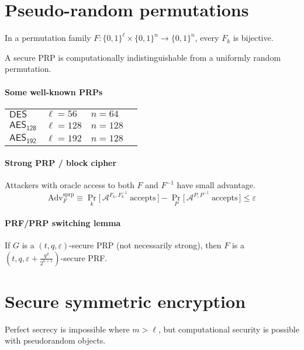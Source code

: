 \documentclass[11pt]{article}
\newcommand{\eqdef}{\ensuremath{\equiv}}
\newcommand{\eps}{\ensuremath{\varepsilon}}
\theoremstyle{remark}
\begin{document}
\section{Pseudo-random permutations}

In a permutation family
$F : \{0,1\}^\ell \times \{0,1\}^n \rightarrow \{0,1\}^n$,
every $F_k$ is bijective.

A secure PRP is computationally indistinguishable from
a uniformly random permutation.

\paragraph{Some well-known PRPs}
\begin{tabular}{l|lll}
$\mathsf{DES}$ & $\ell = 56$ & $n = 64$ \\
$\mathsf{AES_{128}}$ & $\ell = 128$ & $n = 128$ \\
$\mathsf{AES_{192}}$ & $\ell = 192$ & $n = 128$
\end{tabular}

\paragraph{Strong PRP / block cipher}
Attackers with oracle access to both $F$ and $F^{-1}$
have small advantage. \[
\text{Adv}_F^\text{sprp} \eqdef
  \Pr_k \big[\, \mathcal{A}^{F_k,F_k^{-1}} \; \text{accepts} \,\big]
- \Pr_P \big[\, \mathcal{A}^{P,P^{-1}} \; \text{accepts} \,\big]
\le \eps
\]

\paragraph{PRF/PRP switching lemma}
If $G$ is a $(t, q, \eps)$-secure PRP (not necessarily strong),
then $F$ is a $(t, q, \eps + \frac{q^2}{2^{n+1}})$-secure PRF.

\section{Secure symmetric encryption}

Perfect secrecy is impossible where $m > \ell$, but
computational security is possible with pseudorandom objects.
\end{document}
